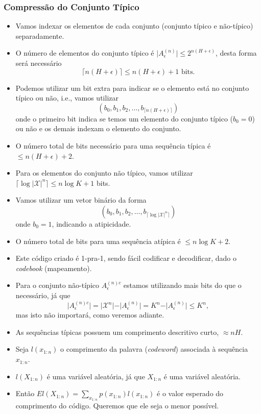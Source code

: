 \begin{frame}[allowframebreaks]
  \frametitle{Compressão do Conjunto Típico}
  \begin{itemize}
  \item Vamos indexar os elementos de cada conjunto (conjunto típico e não-típico) separadamente.
  \item O número de elementos do conjunto típico é $\vert A_\epsilon^{(n)} \vert \leq 2^{n(H+\epsilon)}$, 
        desta forma será necessário
        \begin{equation}
        \lceil n(H+\epsilon) \rceil \leq n (H + \epsilon) + 1 \text{ bits.}
        \end{equation}
  \item Podemos utilizar um bit extra para indicar se o elemento está no conjunto típico ou não, i.e.,
        vamos utilizar
        \begin{equation}
        (b_0,b_1,b_2,\ldots,b_{\lceil n(H+\epsilon) \rceil})
        \end{equation} 
        onde o primeiro bit indica se temos um elemento do conjunto típico ($b_0=0$) ou não 
        e os demais indexam o elemento do conjunto.
  \item O número total de bits necessário para uma sequência típica é $\leq n(H+\epsilon)+2$.
  \item Para os elementos do conjunto não típico, vamos utilizar 
        $\lceil \log \vert \mathcal{X} \vert^n \rceil \leq n \log K + 1$ bits.
  \item Vamos utilizar um vetor binário da forma
        \begin{equation}
        (b_0,b_1,b_2,\ldots,b_{\lceil \log \vert \mathcal{X} \vert^n \rceil})
        \end{equation}
        onde $b_0=1$, indicando a atipicidade.
  \item O número total de bits para uma sequência atípica é $\leq n \log K + 2$.
  \item Este código criado é 1-pra-1, sendo fácil codificar e decodificar, dado o \textit{codebook}
        (mapeamento).
  \item Para o conjunto não-típico $A_\epsilon^{(n)c}$ estamos utilizando mais bits do que o necessário,
        já que
        \begin{equation}
        \vert A_\epsilon^{(n)c} \vert = \vert \mathcal{X}^n \vert - \vert A_\epsilon^{(n)} \vert = 
        K^n - \vert A_\epsilon^{(n)} \vert \leq K^n ,
        \end{equation}
        mas isto não importará, como veremos adiante.
  \item As sequências típicas possuem um comprimento descritivo curto, $\approx nH$.
  \item Seja $l(x_{1:n})$ o comprimento da palavra (\textit{codeword}) associada à sequência $x_{1:n}$.
  \item $l(X_{1:n})$ é uma variável aleatória, já que $X_{1:n}$ é uma variável aleatória.
  \item Então $E l(X_{1:n}) = \sum_{x_{1:n}} p(x_{1:n}) l(x_{1:n})$ é o valor esperado do comprimento 
        do código. Queremos que ele seja o menor possível.
  \end{itemize}
\end{frame}


